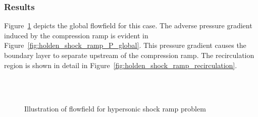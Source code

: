 \subsubsection{Results}
Figure~\ref{fig:holden_shock_ramp_global} depicts the global flowfield for this case.  The adverse pressure gradient induced by the compression ramp is evident in Figure~\ref{fig:holden_shock_ramp_P_global}.  This pressure gradient causes the boundary layer to separate upstream of the compression ramp.  The recirculation region is shown in detail in Figure~\ref{fig:holden_shock_ramp_recirculation}.
\begin{figure}[hbtp]
  \begin{center}
     \\
     \\
    \caption{Illustration of flowfield for hypersonic shock ramp problem\label{fig:holden_shock_ramp_global}}
  \end{center}
\end{figure}

